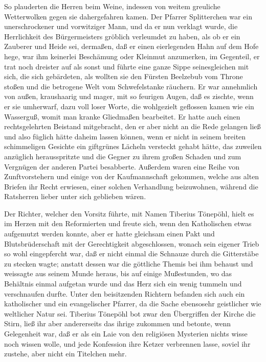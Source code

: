 So plauderten die Herren beim Weine, indessen von weitem greuliche
Wetterwolken gegen sie dahergefahren kamen. Der Pfarrer
Splitterchen war ein unerschrockener und vorwitziger Mann, und da
er nun verklagt wurde, die Herrlichkeit des Bürgermeisters gröblich
verleumdet zu haben, als ob er ein Zauberer und Heide sei,
dermaßen, daß er einen eierlegenden Hahn auf dem Hofe hege, war ihm
keinerlei Beschämung oder Kleinmut anzumerken, im Gegenteil, er
trat noch dreister auf als sonst und führte eine ganze Sippe
seinesgleichen mit sich, die sich gebärdeten, als wollten sie den
Fürsten Beelzebub vom Throne stoßen und die betrogene Welt vom
Schwefelstanke räuchern. Er war annehmlich von außen, kraushaarig
und mager, mit so feurigen Augen, daß es zischte, wenn er sie
umherwarf, dazu voll loser Worte, die wohlgezielt geflossen kamen
wie ein Wasserguß, womit man kranke Gliedmaßen bearbeitet. Er hatte
auch einen rechtsgelehrten Beistand mitgebracht, den er aber nicht
an die Rede gelangen ließ und also füglich hätte daheim lassen
können, wenn er nicht in seinem breiten schimmeligen Gesichte ein
giftgrünes Lächeln versteckt gehabt hätte, das zuweilen anzüglich
herausspritzte und die Gegner zu ihrem großen Schaden und zum
Vergnügen der anderen Partei besabberte. Außerdem waren eine Reihe
von Zunftvorstehern und einige von der Kaufmannschaft gekommen,
welche aus alten Briefen ihr Recht erwiesen, einer solchen
Verhandlung beizuwohnen, während die Ratsherren lieber unter sich
geblieben wären.

\pagenum{[23]} Der Richter, welcher den Vorsitz führte, mit Namen
Tiberius Tönepöhl, hielt es im Herzen mit den Reformierten und
freute sich, wenn den Katholischen etwas aufgemutzt werden konnte,
aber er hatte gleichsam einen Pakt und Blutsbrüderschaft mit der
Gerechtigkeit abgeschlossen, wonach sein eigener Trieb so wohl
eingepfercht war, daß er nicht einmal die Schnauze durch die
Gitterstäbe zu stecken wagte; anstatt dessen war die göttliche
Themis bei ihm behaust und weissagte aus seinem Munde heraus, bis
auf einige Mußestunden, wo das Behältnis einmal aufgetan wurde und
das Herz sich ein wenig tummeln und verschnaufen durfte. Unter den
beisitzenden Richtern befanden sich auch ein katholischer und ein
evangelischer Pfarrer, da die Sache ebensosehr geistlicher wie
weltlicher Natur sei. Tiberius Tönepöhl bot zwar den Übergriffen
der Kirche die Stirn, ließ ihr aber andererseits das ihrige
zukommen und betonte, wenn Gelegenheit war, daß er als ein Laie von
den religiösen Mysterien nichts wisse noch wissen wolle, und jede
Konfession ihre Ketzer verbrennen lasse, soviel ihr zustehe, aber
nicht ein Titelchen mehr.

